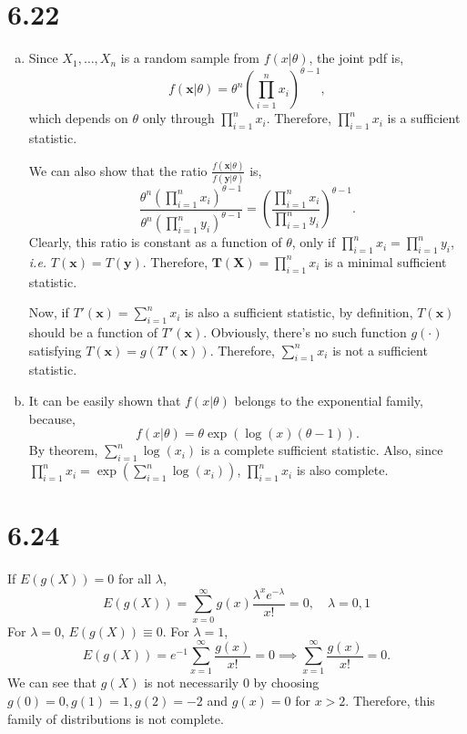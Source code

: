 \documentclass[letterpaper]{article}
\newcommand{\bx}{\mathbf{x}}
\newcommand{\by}{\mathbf{y}}
\newcommand{\TX}{\mathbf{T(X)}}
\begin{document}
    \section*{6.22}
    \begin{enumerate}[(a)]
    \item Since $X_1, \dots, X_n$ is a random sample from $f(x|\theta)$, the joint pdf is, 
    \[
    f(\bx|\theta) = \theta^n \left(\prod_{i=1}^n x_i\right)^{\theta -1},
    \]
    which depends on $\theta$ only through $\prod_{i=1}^n x_i$. Therefore, $\prod_{i=1}^n x_i$ is a sufficient statistic.

    We can also show that the ratio $\frac{f(\bx|\theta)}{f(\by|\theta)}$ is,
    \[
    \frac{\theta^n \left(\prod_{i=1}^n x_i\right)^{\theta -1}}{\theta^n \left(\prod_{i=1}^n y_i\right)^{\theta -1}} = 
    \left(\frac{\prod_{i=1}^n x_i}{\prod_{i=1}^n y_i}\right)^{\theta -1}.
    \]
    Clearly, this ratio is constant as a function of $\theta$, only if $\prod_{i=1}^n x_i = \prod_{i=1}^n y_i$, \emph{i.e.} $T(\bx) = T(\by)$. 
    Therefore, $\TX = \prod_{i=1}^n x_i$ is a minimal sufficient statistic.

    Now, if $T'(\bx) = \sum_{i=1}^n x_i$ is also a sufficient statistic, by definition, $T(\bx)$ should be a function of $T'(\bx)$. Obviously, there's no such function $g(\cdot)$ satisfying $T(\bx) = g(T'(\bx))$. Therefore, $\sum_{i=1}^n x_i$ is not a sufficient statistic.
    \item It can be easily shown that $f(x|\theta)$ belongs to the exponential family, because,
    \[
    f(x|\theta) = \theta \exp(\log(x) (\theta-1)).
    \]
    By theorem, $\sum_{i=1}^n \log(x_i)$ is a complete sufficient statistic. Also, since $\prod_{i=1}^n x_i = \exp\left(\sum_{i=1}^n \log(x_i)\right)$, $\prod_{i=1}^n x_i$ is also complete.
    \end{enumerate}

    \section*{6.24}
    If $E(g(X)) = 0$ for all $\lambda$,
    \[
    E(g(X)) = \sum_{x=0}^\infty g(x) \frac{\lambda^x e^{-\lambda}}{x!} = 0, \quad \lambda = 0, 1
    \]
    For $\lambda = 0$, $E(g(X)) \equiv 0$.  For $\lambda = 1$, 
    \[
    E(g(X)) = e^{-1} \sum_{x=1}^\infty \frac{g(x)}{x!} = 0 \implies \sum_{x=1}^\infty \frac{g(x)}{x!} = 0.
    \]
    We can see that $g(X)$ is not necessarily $0$ by choosing $g(0) = 0, g(1) = 1, g(2) = -2$ and $g(x) = 0$ for $x > 2$. Therefore,
    this family of distributions is not complete.
\end{document}
